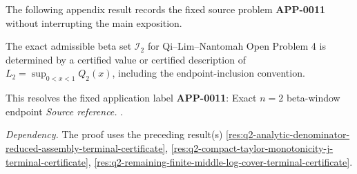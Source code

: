 The following appendix result records the fixed source problem \textbf{APP-0011} \cite{app-app-0004-source} without interrupting the main exposition.
\begin{corollary}[APP-0011: Exact \(n=2\) beta-window endpoint]
\label{res:q2-terminal-exact}
The exact admissible beta set \(\mathcal I_2\) for Qi--Lim--Nantomah Open Problem 4 is determined by a certified value or certified description of \(L_2=\sup_{0<x<1}Q_2(x)\), including the endpoint-inclusion convention.

This resolves the fixed application label \textbf{APP-0011}: Exact \(n=2\) beta-window endpoint
\emph{Source reference.} \cite{app-app-0004-source}.

\emph{Dependency.} The proof uses the preceding result(s) \ref{res:q2-analytic-denominator-reduced-assembly-terminal-certificate}, \ref{res:q2-compact-taylor-monotonicity-j-terminal-certificate}, \ref{res:q2-remaining-finite-middle-log-cover-terminal-certificate}.
\end{corollary}
